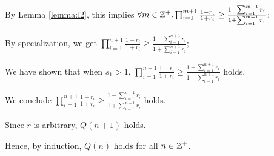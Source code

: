 \documentclass[11pt]{alittlebear}
\begin{document}
{{{{{{                        By Lemma \ref{lemma:l2}, this implies $\forall m\in\mathbb{Z}^+. \prod_{i=1}^{m+1} \frac{1-r_i}{1+r_i} \geq \frac{1 - \sum_{i=1}^{m+1} r_i}{1 + \sum_{i=1}^{m+1} r_i}$;

                        By specialization, we get $\prod_{i=1}^{n+1} \frac{1-r_i}{1+r_i} \geq \frac{1 - \sum_{i=1}^{n+1} r_i}{1 + \sum_{i=1}^{n+1} r_i}$;
                    }
                    We have shown that when $s_1>1$, $\prod_{i=1}^{n+1} \frac{1-r_i}{1+r_i} \geq \frac{1 - \sum_{i=1}^{n+1} r_i}{1 + \sum_{i=1}^{n+1} r_i}$ holds.

                    We conclude $\prod_{i=1}^{n+1} \frac{1-r_i}{1+r_i} \geq \frac{1 - \sum_{i=1}^{n+1} r_i}{1 + \sum_{i=1}^{n+1} r_i}$ holds.
                }
                Since $r$ is arbitrary, $Q(n+1)$ holds.
            }
        }

        Hence, by induction, $Q(n)$ holds for all $n\in\mathbb{Z}^+$.
    }
}
\end{document}
